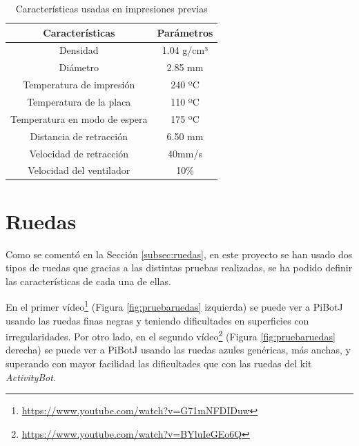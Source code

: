 \begin{table}[H]
	\begin{center}
		\begin{tabular}{|c|c|}
			\hline
			Características & Parámetros\\
			\hline
			 Densidad & 1.04 g/cm³\\
			\hline
			Diámetro & 2.85 mm\\
			\hline
			Temperatura de impresión & 240 ºC\\
			\hline
			Temperatura de la placa & 110 ºC\\
			\hline
			Temperatura en modo de espera & 175 ºC\\
			\hline
			Distancia de retracción & 6.50 mm\\
			\hline
			Velocidad de retracción & 40mm/s\\
			\hline
			Velocidad del ventilador & 10\%\\
			\hline
		\end{tabular}
		\caption{Características usadas en impresiones previas}
		\label{cuadro:cimpresion2}
	\end{center}
\end{table}

\section{Ruedas}
\label{sec:expruedas}
Como se comentó en la Sección \ref{subsec:ruedas}, en este proyecto se han usado dos tipos de ruedas que gracias a las distintas pruebas realizadas, se ha podido definir las características de cada una de ellas. 

En el primer vídeo\footnote{\url{https://www.youtube.com/watch?v=G71mNFDIDuw}} (Figura \ref{fig:pruebaruedas} izquierda) se puede ver a PiBotJ usando las ruedas finas negras y teniendo dificultades en superficies con irregularidades. Por otro lado, en el segundo vídeo\footnote{\url{https://www.youtube.com/watch?v=BYluIeGEo6Q}} (Figura \ref{fig:pruebaruedas} derecha) se puede ver a PiBotJ usando las ruedas azules genéricas, más anchas, y superando con mayor facilidad las dificultades que con las ruedas del kit \textit{ActivityBot}.


